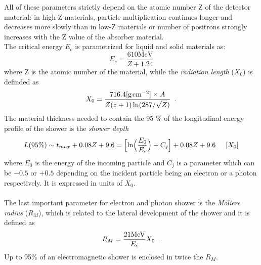 All of these parameters strictly depend on the atomic number Z of the detector material: in high-Z materials, particle multiplication continues longer and decreases more slowly than in low-Z materials or number of positrons strongly increases with the Z value of the absorber material.
\\
The critical energy $E_c$ is parametrized for liquid and solid materials as:
\begin{equation}
E_c = \frac{610 \text{MeV}}{Z+1.24}
\end{equation} 
where Z is the atomic number of the material, while the \emph{radiation length} ($X_0$) is definded as
\begin{equation}
X_0 = \frac{716.4[\text{g}\hspace{0.05cm}\text{cm}^{-2}] \times A}{Z(z+1)\ln(287/\sqrt{Z})} \hspace{0.2cm} \text{.}
\end{equation}
The material thickness needed to contain the 95 \% of the longitudinal energy profile of the shower is the \emph{shower depth}
\begin{equation}
L(95\%) \sim t_{max} + 0.08Z + 9.6 = \Bigl[\ln\Bigl(\frac{E_0}{E_c}\Bigr) + C_j \Bigr] + 0.08Z + 9.6 \hspace{0.5cm} [X_0]
\end{equation}
where $E_0$ is the energy of the incoming particle and $C_j$ is a parameter which can be $-0.5$ or $+0.5$ depending on the incident particle being an electron or a photon respectively. It is expressed in units of $X_0$.
\\\\
The last important parameter for electron and photon shower is the \emph{Moliere radius} ($R_M$), which is related to the lateral development of the shower and it is defined as
\begin{equation}
R_M = \frac{21 \text{MeV}}{E_c}X_0 \hspace{0.2cm} \text{.}
\end{equation}
Up to 95\% of an electromagnetic shower is enclosed in twice the $R_M$.

